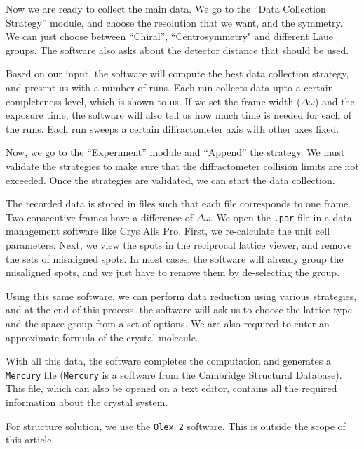 Now we are ready to collect the main data. We go to the ``Data Collection Strategy'' module, and choose the resolution that we want, and the symmetry. We can just choose between ``Chiral'',  ``Centrosymmetry" and different Laue groups. The software also asks about the detector distance that should be used.

Based on our input, the software will compute the best data collection strategy, and present us with a number of runs. Each run collects data upto a certain completeness level, which is shown to us. If we set the frame width ($\Delta \omega$) and the exposure time, the software will also tell us how much time is needed for each of the runs. Each run sweeps a certain diffractometer axis with other axes fixed.

Now, we go to the ``Experiment'' module and ``Append'' the strategy. We must validate the strategies to make sure that the diffractometer collision limits are not exceeded. Once the strategies are validated, we can start the data collection.

The recorded data is stored in files such that each file corresponds to one frame. Two consecutive frames have a difference of $\Delta \omega.$ We open the \texttt{.par} file in a data management software like Crys Alis Pro. First, we re-calculate the unit cell parameters. Next, we view the spots in the reciprocal lattice viewer, and remove the sets of misaligned spots. In most cases, the software will already group the misaligned spots, and we just have to remove them by de-selecting the group.

Using this same software, we can perform data reduction using various strategies, and at the end of this process, the software will ask us to choose the lattice type and the space group from a set of options. We are also required to enter an approximate formula of the crystal molecule.

With all this data, the software completes the computation and generates a \texttt{Mercury} file (\texttt{Mercury} is a software from the Cambridge Structural Database). This file, which can also be opened on a text editor, contains all the required information about the crystal system.

For structure solution, we use the \texttt{Olex 2} software. This is outside the scope of this article.
